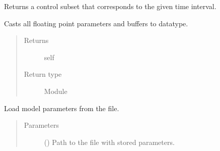 \documentclass[letterpaper,10pt,english]{sphinxmanual}
\begin{document}
\begin{fulllineitems}
\begin{fulllineitems}
\label{\detokenize{api/dynamics:geology.metamodelling.dynamics.LatentSpaceDynamics.get_control_subset}}
Returns a control subset that corresponds to the given time interval.

\end{fulllineitems}


\begin{fulllineitems}
\label{\detokenize{api/dynamics:geology.metamodelling.dynamics.LatentSpaceDynamics.half}}
Casts all floating point parameters and buffers to  datatype.
\begin{quote}\begin{description}
\item[{Returns}] \leavevmode
self

\item[{Return type}] \leavevmode
Module

\end{description}\end{quote}

\end{fulllineitems}


\begin{fulllineitems}
\label{\detokenize{api/dynamics:geology.metamodelling.dynamics.LatentSpaceDynamics.load}}
Load model parameters from the file.
\begin{quote}\begin{description}
\item[{Parameters}] \leavevmode
{} () \textendash{} Path to the file with stored parameters.

\end{description}\end{quote}


\end{fulllineitems}
\end{fulllineitems}
\end{document}
